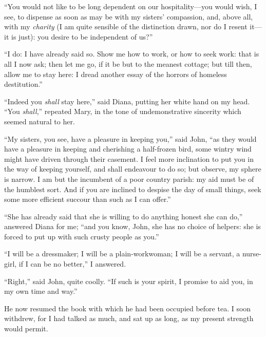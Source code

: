 \enquote{You would not like to be long dependent on our hospitality---you would
	wish, I see, to dispense as soon as may be with my sisters' compassion,
	and, above all, with my \emph{charity} (I am quite sensible of the
	distinction drawn, nor do I resent it---it is just): you desire to be
	independent of us?}

\enquote{I do: I have already said so. Show me how to work, or how to
	seek work: that is all I now ask; then let me go, if it be but to the
	meanest cottage; but till then, allow me to stay here: I dread another
	essay of the horrors of homeless destitution.}

\enquote{Indeed you \emph{shall} stay here,} said Diana, putting her white
hand on my head. \enquote{You \emph{shall},} repeated Mary, in the tone of
undemonstrative sincerity which seemed natural to her.

\enquote{My sisters, you see, have a pleasure in keeping you,} said \Mr{}
\St{} John, \enquote{as they would have a pleasure in keeping and
	cherishing a half-frozen bird, some wintry wind might have driven
	through their casement. I feel more inclination to put you in the way
	of keeping yourself, and shall endeavour to do so; but observe, my
	sphere is narrow. I am but the incumbent of a poor country parish: my
	aid must be of the humblest sort. And if you are inclined to despise
	the day of small things, seek some more efficient succour than such as I
	can offer.}

\enquote{She has already said that she is willing to do anything honest
	she can do,} answered Diana for me; \enquote{and you know, \St{} John, she
	has no choice of helpers: she is forced to put up with such crusty
	people as you.}

\enquote{I will be a dressmaker; I will be a plain-workwoman; I will be
	a servant, a nurse-girl, if I can be no better,} I answered.

\enquote{Right,} said \Mr{} \St{} John, quite coolly. \enquote{If such is
	your spirit, I promise to aid you, in my own time and way.}

He now resumed the book with which he had been occupied before tea. I
soon withdrew, for I had talked as much, and sat up as long, as my
present strength would permit.
